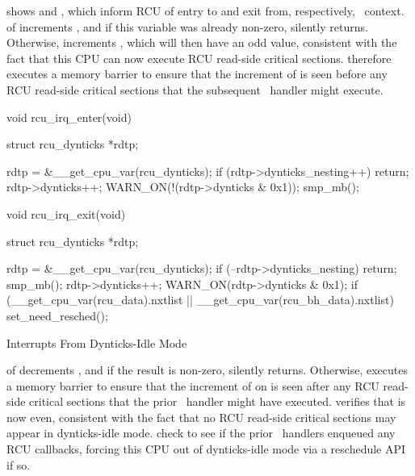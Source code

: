 \begin{fcvref}
shows  and , which
inform RCU of entry to and exit from, respectively, \IRQ\ context.
 of  increments ,
and if this variable was already non-zero,  silently returns.
Otherwise,  increments ,
which will then have
an odd value, consistent with the fact that this CPU can now
execute RCU read-side critical sections.
 therefore executes a memory barrier to ensure that
the increment of  is seen before any
RCU read-side critical sections that the subsequent \IRQ\ handler
might execute.

\begin{listing}[tbp]
\begin{fcvlabel}
\begin{VerbatimL}[commandchars=\\\[\]]
void rcu_irq_enter(void)
{
	struct rcu_dynticks *rdtp;

	rdtp = &__get_cpu_var(rcu_dynticks);
	if (rdtp->dynticks_nesting++)		
		return;				\lnlbl[ret1]
	rdtp->dynticks++;			
	WARN_ON(!(rdtp->dynticks & 0x1));
	smp_mb();				\lnlbl[mb1]
}

void rcu_irq_exit(void)
{
	struct rcu_dynticks *rdtp;

	rdtp = &__get_cpu_var(rcu_dynticks);
	if (--rdtp->dynticks_nesting)		
		return;				\lnlbl[ret2]
	smp_mb();				\lnlbl[mb2]
	rdtp->dynticks++;			
	WARN_ON(rdtp->dynticks & 0x1);		
	if (__get_cpu_var(rcu_data).nxtlist ||	\lnlbl[chk_cb:b]
	    __get_cpu_var(rcu_bh_data).nxtlist)
		set_need_resched();		\lnlbl[chk_cb:e]
}
\end{VerbatimL}
\end{fcvlabel}
\caption{Interrupts From Dynticks-Idle Mode}
\label{lst:formal:Interrupts From Dynticks-Idle Mode}
\end{listing}

 of  decrements
, and
if the result is non-zero,  silently returns.
Otherwise,  executes a memory barrier to ensure that the
increment of  on  is seen after any RCU
read-side critical sections that the prior \IRQ\ handler might have executed.
 verifies that  is now even, consistent with
the fact that no RCU read-side critical sections may appear in
dynticks-idle mode.
 check to see
if the prior \IRQ\ handlers enqueued any
RCU callbacks, forcing this CPU out of dynticks-idle mode via
a reschedule API if so.
\end{fcvref}

